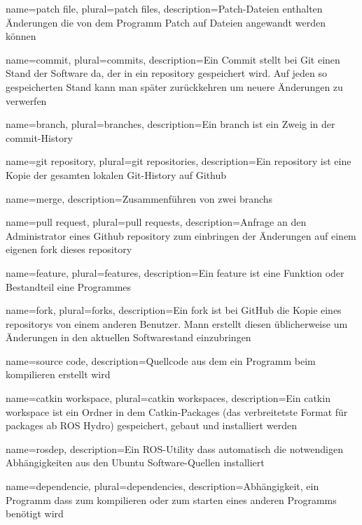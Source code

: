 {
  name={patch file},
  plural={patch files},
  description={Patch-Dateien enthalten Änderungen die von dem Programm Patch auf Dateien angewandt werden können}
}

{
  name={commit},
  plural={commits},
  description={Ein Commit stellt bei Git einen Stand der Software da, der in ein \Gls{repository} gespeichert wird. Auf jeden so gespeicherten Stand kann man später zurückkehren um neuere Änderungen zu verwerfen}

{
  name={branch},
  plural={branches},
  description={Ein branch ist ein Zweig in der \Gls{commit}-History}
}

{
  name={git repository},
  plural={git repositories},
  description={Ein repository ist eine Kopie der gesamten lokalen Git-History auf Github}
}

{
  name={merge},
  description={Zusammenführen von zwei \Glspl{branch}}
}

{
  name={pull request},
  plural={pull requests},
  description={Anfrage an den Administrator eines Github \Gls{repository} zum einbringen der Änderungen auf einem eigenen \Gls{fork} dieses \Gls{repository}}
}

{
  name={feature},
  plural={features},
  description={Ein feature ist eine Funktion oder Bestandteil eine Programmes}
}

{
  name={fork},
  plural={forks},
  description={Ein fork ist bei GitHub die Kopie eines \Gls{repository}s von einem anderen Benutzer. Mann erstellt diesen üblicherweise um Änderungen in den aktuellen Softwarestand einzubringen}
}

{
  name={source code},
  description={Quellcode aus dem ein Programm beim kompilieren erstellt wird}
}

{
  name={catkin workspace},
  plural={catkin workspaces},
  description={Ein catkin workspace ist ein Ordner in dem Catkin-Packages (das verbreitetste Format für \Glspl{package} ab ROS Hydro) gespeichert, gebaut und installiert werden}
}

{
  name={rosdep},
  description={Ein ROS-Utility dass automatisch die notwendigen Abhängigkeiten aus den Ubuntu Software-Quellen installiert}
}

{
  name={dependencie},
  plural={dependencies},
  description={Abhängigkeit, ein Programm dass zum kompilieren oder zum starten eines anderen Programms benötigt wird}
}

}
